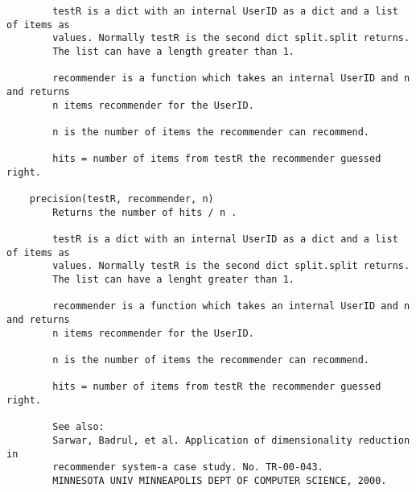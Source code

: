 \begin{lstlisting}
        testR is a dict with an internal UserID as a dict and a list of items as
        values. Normally testR is the second dict split.split returns.
        The list can have a length greater than 1.
        
        recommender is a function which takes an internal UserID and n and returns
        n items recommender for the UserID.
        
        n is the number of items the recommender can recommend.
        
        hits = number of items from testR the recommender guessed right.
    
    precision(testR, recommender, n)
        Returns the number of hits / n .
        
        testR is a dict with an internal UserID as a dict and a list of items as
        values. Normally testR is the second dict split.split returns.
        The list can have a lenght greater than 1.
        
        recommender is a function which takes an internal UserID and n and returns
        n items recommender for the UserID.
        
        n is the number of items the recommender can recommend.
        
        hits = number of items from testR the recommender guessed right.
        
        See also:
        Sarwar, Badrul, et al. Application of dimensionality reduction in
        recommender system-a case study. No. TR-00-043.
        MINNESOTA UNIV MINNEAPOLIS DEPT OF COMPUTER SCIENCE, 2000.
\end{lstlisting}

